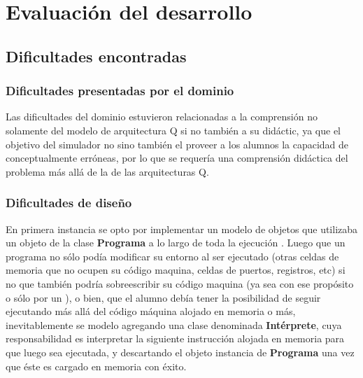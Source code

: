 \chapter{Evaluación del desarrollo}

\section{Dificultades encontradas}

\subsection{Dificultades presentadas por el dominio}
Las dificultades del dominio estuvieron relacionadas a la comprensión no solamente del modelo de arquitectura Q si no también a su  didáctic, ya que el objetivo del simulador no  sino también el proveer a los alumnos la capacidad de  conceptualmente erróneas, por lo que se requería una comprensión didáctica del problema más allá de la  de las arquitecturas Q. 


\subsection{Dificultades de diseño}
En primera instancia se opto por implementar un modelo de objetos que utilizaba un objeto de la clase \textbf{Programa} a lo largo de toda la ejecución . Luego que un programa no sólo podía modificar su entorno al ser ejecutado (otras celdas de memoria que no ocupen su código maquina, celdas de puertos, registros, etc) si no que también podría sobreescribir su código maquina (ya sea con ese propósito o sólo por un ), o bien, que el alumno debía tener la posibilidad de seguir ejecutando más allá del código máquina alojado en memoria o más, inevitablemente se  modelo agregando una clase denominada \textbf{Intérprete}, cuya responsabilidad es interpretar la siguiente instrucción alojada en memoria para que luego sea ejecutada, y descartando el objeto instancia de \textbf{Programa} una vez que éste es cargado en memoria con éxito.\\

